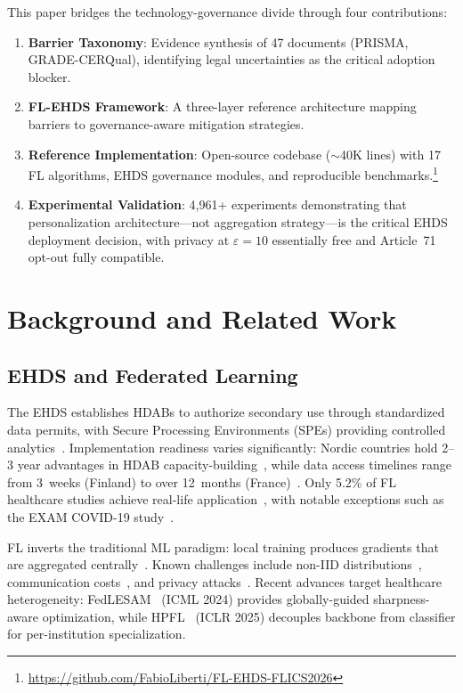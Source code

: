 \documentclass[conference]{IEEEtran}
\begin{document}
This paper bridges the technology-governance divide through four contributions:
\begin{enumerate}
    \item \textbf{Barrier Taxonomy}: Evidence synthesis of 47 documents (PRISMA, GRADE-CERQual), identifying legal uncertainties as the critical adoption blocker.
    \item \textbf{FL-EHDS Framework}: A three-layer reference architecture mapping barriers to governance-aware mitigation strategies.
    \item \textbf{Reference Implementation}: Open-source codebase ($\sim$40K lines) with 17 FL algorithms, EHDS governance modules, and reproducible benchmarks.\footnote{\url{https://github.com/FabioLiberti/FL-EHDS-FLICS2026}}
    \item \textbf{Experimental Validation}: 4,961+ experiments demonstrating that personalization architecture---not aggregation strategy---is the critical EHDS deployment decision, with privacy at $\varepsilon{=}10$ essentially free and Article~71 opt-out fully compatible.
\end{enumerate}

\section{Background and Related Work}
\label{sec:background}

\subsection{EHDS and Federated Learning}

The EHDS establishes HDABs to authorize secondary use through standardized data permits, with Secure Processing Environments (SPEs) providing controlled analytics~\cite{svingel2025hdab}. Implementation readiness varies significantly: Nordic countries hold 2--3 year advantages in HDAB capacity-building~\cite{tehdas2024ready}, while data access timelines range from 3~weeks (Finland) to over 12~months (France)~\cite{forster2025journeys}. Only 5.2\% of FL healthcare studies achieve real-life application~\cite{teo2024systematic}, with notable exceptions such as the EXAM COVID-19 study~\cite{dayan2021federated}.

FL inverts the traditional ML paradigm: local training produces gradients that are aggregated centrally~\cite{mcmahan2017communication}. Known challenges include non-IID distributions~\cite{li2020federated}, communication costs~\cite{bonawitz2019scale}, and privacy attacks~\cite{zhu2019deep, shokri2017membership}. Recent advances target healthcare heterogeneity: FedLESAM~\cite{qu2024fedlesam} (ICML 2024) provides globally-guided sharpness-aware optimization, while HPFL~\cite{chen2025hpfl} (ICLR 2025) decouples backbone from classifier for per-institution specialization.
\end{document}
